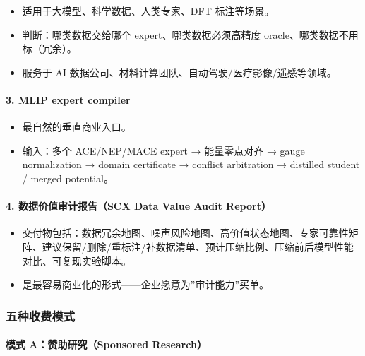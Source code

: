 \documentclass[
  12pt,
]{ctexart}
\providecommand{\tightlist}{%
  \setlength{\itemsep}{0pt}\setlength{\parskip}{0pt}}
\begin{document}
\begin{itemize}
\tightlist
\item
  适用于大模型、科学数据、人类专家、DFT 标注等场景。
\item
  判断：哪类数据交给哪个 expert、哪类数据必须高精度
  oracle、哪类数据不用标（冗余）。
\item
  服务于 AI 数据公司、材料计算团队、自动驾驶/医疗影像/遥感等领域。
\end{itemize}

\paragraph{3. MLIP expert compiler}\label{mlip-expert-compiler}

\begin{itemize}
\tightlist
\item
  最自然的垂直商业入口。
\item
  输入：多个 ACE/NEP/MACE expert → 能量零点对齐 → gauge normalization →
  domain certificate → conflict arbitration → distilled student / merged
  potential。
\end{itemize}

\paragraph{4. 数据价值审计报告（SCX Data Value Audit
Report）}\label{ux6570ux636eux4ef7ux503cux5ba1ux8ba1ux62a5ux544ascx-data-value-audit-report}

\begin{itemize}
\tightlist
\item
  交付物包括：数据冗余地图、噪声风险地图、高价值状态地图、专家可靠性矩阵、建议保留/删除/重标注/补数据清单、预计压缩比例、压缩前后模型性能对比、可复现实验脚本。
\item
  是最容易商业化的形式------企业愿意为''审计能力''买单。
\end{itemize}

\subsubsection{五种收费模式}\label{ux4e94ux79cdux6536ux8d39ux6a21ux5f0f}

\paragraph{模式 A：赞助研究（Sponsored
Research）}\label{ux6a21ux5f0f-aux8d5eux52a9ux7814ux7a76sponsored-research}
\end{document}
